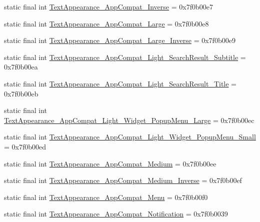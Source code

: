 \begin{CompactItemize}
static final int \hyperlink{classandroid_1_1support_1_1graphics_1_1drawable_1_1animated_1_1_r_1_1style_24548ccbc379cee7c86c3cba24c889b3}{TextAppearance\_\-AppCompat\_\-Inverse} = 0x7f0b00e7
\item 
static final int \hyperlink{classandroid_1_1support_1_1graphics_1_1drawable_1_1animated_1_1_r_1_1style_8bfde126afbd05486eea2143d07c1f93}{TextAppearance\_\-AppCompat\_\-Large} = 0x7f0b00e8
\item 
static final int \hyperlink{classandroid_1_1support_1_1graphics_1_1drawable_1_1animated_1_1_r_1_1style_1b5509d3d16cee8caf0135dcb28018bd}{TextAppearance\_\-AppCompat\_\-Large\_\-Inverse} = 0x7f0b00e9
\item 
static final int \hyperlink{classandroid_1_1support_1_1graphics_1_1drawable_1_1animated_1_1_r_1_1style_a1a070c884a71489ccf411780986b91d}{TextAppearance\_\-AppCompat\_\-Light\_\-SearchResult\_\-Subtitle} = 0x7f0b00ea
\item 
static final int \hyperlink{classandroid_1_1support_1_1graphics_1_1drawable_1_1animated_1_1_r_1_1style_bdcf803feea71e16282ce1f641ce24bb}{TextAppearance\_\-AppCompat\_\-Light\_\-SearchResult\_\-Title} = 0x7f0b00eb
\item 
static final int \hyperlink{classandroid_1_1support_1_1graphics_1_1drawable_1_1animated_1_1_r_1_1style_0aacd4d3ec54ef350ec261d63853ed06}{TextAppearance\_\-AppCompat\_\-Light\_\-Widget\_\-PopupMenu\_\-Large} = 0x7f0b00ec
\item 
static final int \hyperlink{classandroid_1_1support_1_1graphics_1_1drawable_1_1animated_1_1_r_1_1style_8491e4492ddfc3be9c04307e0c63d6b0}{TextAppearance\_\-AppCompat\_\-Light\_\-Widget\_\-PopupMenu\_\-Small} = 0x7f0b00ed
\item 
static final int \hyperlink{classandroid_1_1support_1_1graphics_1_1drawable_1_1animated_1_1_r_1_1style_bccafac15fa319bf32d63fe91a644c9f}{TextAppearance\_\-AppCompat\_\-Medium} = 0x7f0b00ee
\item 
static final int \hyperlink{classandroid_1_1support_1_1graphics_1_1drawable_1_1animated_1_1_r_1_1style_b9b9856f20c0e917e00eef9ad699b7dd}{TextAppearance\_\-AppCompat\_\-Medium\_\-Inverse} = 0x7f0b00ef
\item 
static final int \hyperlink{classandroid_1_1support_1_1graphics_1_1drawable_1_1animated_1_1_r_1_1style_e22ce9f78e60af355c40e39a1c060a10}{TextAppearance\_\-AppCompat\_\-Menu} = 0x7f0b00f0
\item 
static final int \hyperlink{classandroid_1_1support_1_1graphics_1_1drawable_1_1animated_1_1_r_1_1style_2101e4acd505045da8f3be43e0be89bf}{TextAppearance\_\-AppCompat\_\-Notification} = 0x7f0b0039

\end{CompactItemize}
